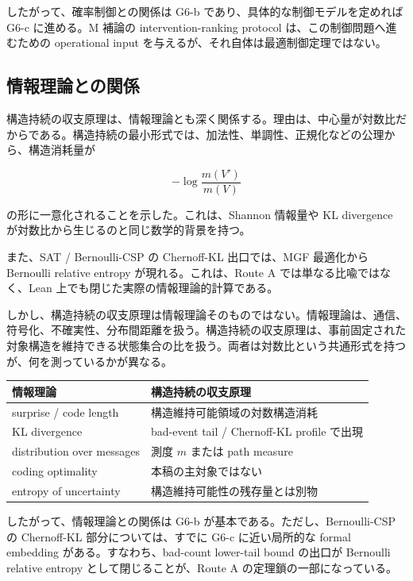 \documentclass[12pt,a4paper]{article}
\begin{document}
したがって、確率制御との関係は G6-b であり、具体的な制御モデルを定めれば G6-c に進める。M 補論の intervention-ranking protocol は、この制御問題へ進むための operational input を与えるが、それ自体は最適制御定理ではない。

\subsection{情報理論との関係}\label{ux60c5ux5831ux7406ux8ad6ux3068ux306eux95a2ux4fc2}

構造持続の収支原理は、情報理論とも深く関係する。理由は、中心量が対数比だからである。構造持続の最小形式では、加法性、単調性、正規化などの公理から、構造消耗量が

\[
-\log \frac{m(V')}{m(V)}
\]

の形に一意化されることを示した。これは、Shannon 情報量や KL divergence が対数比から生じるのと同じ数学的背景を持つ。

また、SAT / Bernoulli-CSP の Chernoff-KL 出口では、MGF 最適化から Bernoulli relative entropy が現れる。これは、Route A では単なる比喩ではなく、Lean 上でも閉じた実際の情報理論的計算である。

しかし、構造持続の収支原理は情報理論そのものではない。情報理論は、通信、符号化、不確実性、分布間距離を扱う。構造持続の収支原理は、事前固定された対象構造を維持できる状態集合の比を扱う。両者は対数比という共通形式を持つが、何を測っているかが異なる。

{\def\LTcaptype{table} %
\begin{longtable}[]{@{}ll@{}}
\toprule\noalign{}
情報理論 & 構造持続の収支原理 \\
\midrule\noalign{}
\endhead
\bottomrule\noalign{}
\endlastfoot
surprise / code length & 構造維持可能領域の対数構造消耗 \\
KL divergence & bad-event tail / Chernoff-KL profile で出現 \\
distribution over messages & 測度 \(m\) または path measure \\
coding optimality & 本稿の主対象ではない \\
entropy of uncertainty & 構造維持可能性の残存量とは別物 \\
\end{longtable}
}

したがって、情報理論との関係は G6-b が基本である。ただし、Bernoulli-CSP の Chernoff-KL 部分については、すでに G6-c に近い局所的な formal embedding がある。すなわち、bad-count lower-tail bound の出口が Bernoulli relative entropy として閉じることが、Route A の定理鎖の一部になっている。
\end{document}
